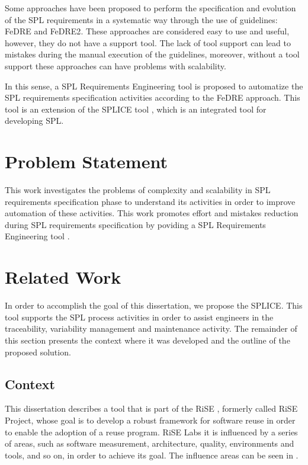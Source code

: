 Some approaches have been proposed to perform the specification and evolution of
the \ac{SPL} requirements in a systematic way through the use of guidelines: 
\acf{FeDRE} and \acf{FeDRE2}.
These approaches are considered easy to use and useful, however, they do not have a support tool. 
The lack of tool support can lead to mistakes during the manual execution of the guidelines, moreover, 
without a tool support these approaches can have problems with scalability.

In this sense, a \ac{SPL} Requirements Engineering tool is proposed to automatize the
\ac{SPL} requirements specification activities according to the \ac{FeDRE} approach. This tool is 
an extension of the \ac{SPLICE} tool \citep{splice2014cbsof}, which is an
integrated tool for developing \ac{SPL}.

\section{Problem Statement}
\label{sc:problem}

This work investigates the problems of complexity and scalability in \ac{SPL}
requirements specification phase to understand its activities in order to improve 
automation of these activities. This work promotes effort and mistakes reduction during 
SPL requirements specification by poviding a \ac{SPL} Requirements Engineering tool .   

\section{Related Work}
\label{sc:related}
In order to accomplish the goal of this dissertation, we propose the \acf{SPLICE}.
This tool supports the \acf{SPL} process activities in order to assist engineers in the traceability, variability management and maintenance activity.
The remainder of this section presents the context where it was developed and the outline of the proposed solution.

\subsection{Context}
This dissertation describes a tool that is part of the \ac{RiSE} \citep{Almeida2004}, formerly
called RiSE Project, whose goal is to develop a robust framework for software
reuse in order to enable the adoption of a reuse program. RiSE Labs it is
influenced by a series of areas, such as software measurement, architecture,
quality, environments and tools, and so on, in order to achieve its goal. The
influence areas can be seen in .

